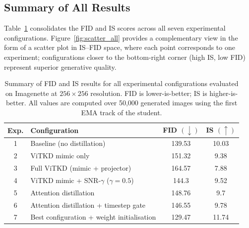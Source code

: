 \subsection{Summary of All Results}
\label{subsec:results_summary}

Table~\ref{tab:all_results} consolidates the FID and IS scores across all
seven experimental configurations. Figure~\ref{fig:scatter_all} provides
a complementary view in the form of a scatter plot in IS--FID space, where
each point corresponds to one experiment; configurations closer to the
bottom-right corner (high IS, low FID) represent superior generative quality.

\begin{table}[ht]
    \centering
    \caption{Summary of FID and IS results for all experimental
    configurations evaluated on Imagenette at $256 \times 256$ resolution.
    FID is lower-is-better; IS is higher-is-better. All values are computed
    over 50{,}000 generated images using the first EMA track of the student.}
    \label{tab:all_results}
    \begin{tabular}{clcc}
        \toprule
        \textbf{Exp.} & \textbf{Configuration} & \textbf{FID} $(\downarrow)$ & \textbf{IS} $(\uparrow)$ \\
        \midrule
        1 & Baseline (no distillation)                         & 139.53 & 10.03 \\ 
        2 & ViTKD mimic only                                   & 151.32 & 9.38\\ 
        3 & Full ViTKD (mimic + projector)                     & 164.57 & 7.88 \\ 
        4 & ViTKD mimic + SNR-$\gamma$ ($\gamma{=}0.5$)       & 144.3  & 9.52 \\ 
        5 & Attention distillation                             & 148.76 & 9.7  \\ 
        6 & Attention distillation + timestep gate             & 146.55 & 9.78 \\ 
        7 & Best configuration + weight initialisation           & 129.47 & 11.74 \\ 
        \bottomrule
    \end{tabular}
\end{table}

